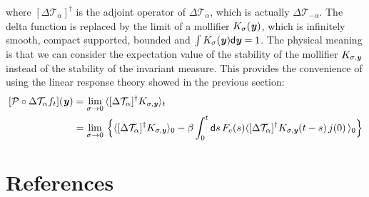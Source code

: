 \documentclass[aip,jcp,a4paper,reprint,onecolumn]{revtex4-1}
\newcommand{\vect}[1]{\textbf{\textit{#1}}}
\newcommand{\dd}{\textsf{d}}
\newcommand{\mt}{\mathcal T}
\begin{document}
where $[\Delta \mt_\alpha]^\dagger$ is the adjoint operator of $\Delta
\mt_\alpha$, which is actually $\Delta \mt_{-\alpha}$. The delta
function is replaced by the limit of a mollifier $K_\sigma(\vect y)$,
which is infinitely smooth, compact supported, bounded and $\int
K_\sigma(\vect y)\dd \vect y = 1$.  The physical meaning is that we
can consider the expectation value of the stability of the mollifier
$K_{\sigma, \vect y}$ instead of the stability of the invariant measure.
This provides the convenience of using the linear response theory showed
in the previous section:
\begin{align}\nonumber
  [\mathcal P\circ\Delta \mt_\alpha f_t](\vect y)
  &=
  \lim_{\sigma \rightarrow 0}\,
  \langle
  [\Delta \mt_\alpha]^\dagger K_{\sigma, \vect y}
  \rangle_t \\
  &=
  \lim_{\sigma \rightarrow 0}\,
  \Big\{
  \langle
  [\Delta \mt_\alpha]^\dagger K_{\sigma, \vect y}
  \rangle_0  -
  \beta
  \int_0^t\dd s\,
  F_e(s)
  \langle
  [\Delta \mt_\alpha]^\dagger K_{\sigma, \vect y}(t-s)\,
  j(0)\,
  \rangle_0
  \Big\}
\end{align}



\section*{References}
{}

\end{document}
